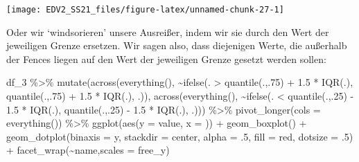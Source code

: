\documentclass[
]{book}
\newenvironment{Shaded}{\begin{snugshade}}{\end{snugshade}}
\newcommand{\AttributeTok}[1]{\textcolor[rgb]{0.77,0.63,0.00}{#1}}
\newcommand{\DecValTok}[1]{\textcolor[rgb]{0.00,0.00,0.81}{#1}}
\newcommand{\FloatTok}[1]{\textcolor[rgb]{0.00,0.00,0.81}{#1}}
\newcommand{\FunctionTok}[1]{\textcolor[rgb]{0.00,0.00,0.00}{#1}}
\newcommand{\NormalTok}[1]{#1}
\newcommand{\SpecialCharTok}[1]{\textcolor[rgb]{0.00,0.00,0.00}{#1}}
\newcommand{\StringTok}[1]{\textcolor[rgb]{0.31,0.60,0.02}{#1}}
\begin{document}
\begin{center}\texttt{[image: EDV2\_SS21\_files/figure-latex/unnamed-chunk-27-1]} \end{center}

Oder wir `windsorieren' unsere Ausreißer, indem wir sie durch den Wert der jeweiligen Grenze ersetzen.
Wir sagen also, dass diejenigen Werte, die außerhalb der Fences liegen auf den Wert der jeweiligen Grenze gesetzt werden sollen:

\begin{Shaded}
\begin{Highlighting}[]
\NormalTok{df\_3 }\SpecialCharTok{\%\textgreater{}\%} 
  \FunctionTok{mutate}\NormalTok{(}\FunctionTok{across}\NormalTok{(}\FunctionTok{everything}\NormalTok{(),}
                \SpecialCharTok{\textasciitilde{}}\FunctionTok{ifelse}\NormalTok{(. }\SpecialCharTok{\textgreater{}}  \FunctionTok{quantile}\NormalTok{(.,.}\DecValTok{75}\NormalTok{) }\SpecialCharTok{+} \FloatTok{1.5} \SpecialCharTok{*} \FunctionTok{IQR}\NormalTok{(.),}
                        \FunctionTok{quantile}\NormalTok{(.,.}\DecValTok{75}\NormalTok{) }\SpecialCharTok{+} \FloatTok{1.5} \SpecialCharTok{*} \FunctionTok{IQR}\NormalTok{(.),}
\NormalTok{                        .)),}
         \FunctionTok{across}\NormalTok{(}\FunctionTok{everything}\NormalTok{(),}
                \SpecialCharTok{\textasciitilde{}}\FunctionTok{ifelse}\NormalTok{(. }\SpecialCharTok{\textless{}}  \FunctionTok{quantile}\NormalTok{(.,.}\DecValTok{25}\NormalTok{) }\SpecialCharTok{{-}} \FloatTok{1.5} \SpecialCharTok{*} \FunctionTok{IQR}\NormalTok{(.),}
                        \FunctionTok{quantile}\NormalTok{(.,.}\DecValTok{25}\NormalTok{) }\SpecialCharTok{{-}} \FloatTok{1.5} \SpecialCharTok{*} \FunctionTok{IQR}\NormalTok{(.),}
\NormalTok{                        .))) }\SpecialCharTok{\%\textgreater{}\%} 
\FunctionTok{pivot\_longer}\NormalTok{(}\AttributeTok{cols =} \FunctionTok{everything}\NormalTok{()) }\SpecialCharTok{\%\textgreater{}\%} 
  \FunctionTok{ggplot}\NormalTok{(}\FunctionTok{aes}\NormalTok{(}\AttributeTok{y =}\NormalTok{ value, }\AttributeTok{x =} \StringTok{\textquotesingle{}\textquotesingle{}}\NormalTok{)) }\SpecialCharTok{+}
  \FunctionTok{geom\_boxplot}\NormalTok{() }\SpecialCharTok{+}
  \FunctionTok{geom\_dotplot}\NormalTok{(}\AttributeTok{binaxis =} \StringTok{\textquotesingle{}y\textquotesingle{}}\NormalTok{,}
               \AttributeTok{stackdir =} \StringTok{\textquotesingle{}center\textquotesingle{}}\NormalTok{,}
               \AttributeTok{alpha =}\NormalTok{ .}\DecValTok{5}\NormalTok{,}
               \AttributeTok{fill =} \StringTok{\textquotesingle{}red\textquotesingle{}}\NormalTok{,}
               \AttributeTok{dotsize =}\NormalTok{ .}\DecValTok{5}\NormalTok{) }\SpecialCharTok{+}
  \FunctionTok{facet\_wrap}\NormalTok{(}\SpecialCharTok{\textasciitilde{}}\NormalTok{name,}\AttributeTok{scales =} \StringTok{\textquotesingle{}free\_y\textquotesingle{}}\NormalTok{)}
\end{Highlighting}
\end{Shaded}
\end{document}
